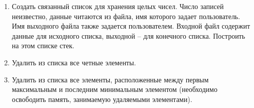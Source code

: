 \begin{enumerate}
    \item Создать связанный список для хранения целых чисел. Число записей неизвестно, данные читаются из файла, имя которого задает пользователь. Имя выходного файла также задается пользователем. Входной файл содержит данные для исходного списка, выходной – для конечного списка. Построить на этом списке стек.
    \item Удалить из списка все четные элементы.
    \item Удалить из списка все элементы, расположенные между первым максимальным и последним минимальным элементом (необходимо освободить память, занимаемую удаляемыми элементами).
\end{enumerate}
